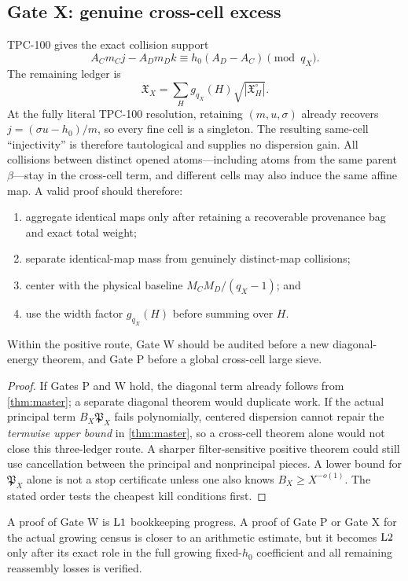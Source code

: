 \subsection{Gate X: genuine cross-cell excess}

TPC-100 gives the exact collision support
\[
 A_Cm_Cj-A_Dm_Dk
 \equiv h_0(A_D-A_C)\pmod{q_X}.
\]
The remaining ledger is
\[
 \mathfrak X_X
 =
 \sum_Hg_{q_X}(H)
 \sqrt{|\mathfrak X_H^\circ|}.
\]
At the fully literal TPC-100 resolution, retaining
\((m,u,\sigma)\) already recovers
\(j=(\sigma u-h_0)/m\), so every fine cell is a singleton.
The resulting same-cell ``injectivity'' is therefore tautological
and supplies no dispersion gain.  All collisions between distinct
opened atoms---including atoms from the same parent \(\beta\)---stay
in the cross-cell term, and different cells may also induce the same
affine map.  A valid proof should therefore:
\begin{enumerate}[leftmargin=2em]
\item aggregate identical maps only after retaining a recoverable
  provenance bag and exact total weight;
\item separate identical-map mass from genuinely distinct-map
  collisions;
\item center with the physical baseline \(M_CM_D/(q_X-1)\); and
\item use the width factor \(g_{q_X}(H)\) before summing over \(H\).
\end{enumerate}

\begin{proposition}
\label{prop:attack-order}
Within the positive route, Gate W should be audited before a new
diagonal-energy theorem, and Gate P before a global cross-cell
large sieve.
\end{proposition}

\begin{proof}
If Gates P and W hold, the diagonal term already follows from
\cref{thm:master}; a separate diagonal theorem would duplicate work.
If the actual principal term \(B_X\mathfrak P_X\) fails
polynomially, centered dispersion cannot repair the
\emph{termwise upper bound} in \cref{thm:master}, so a cross-cell
theorem alone would not close this three-ledger route.  A sharper
filter-sensitive positive theorem could still use cancellation
between the principal and nonprincipal pieces.  A lower bound for
\(\mathfrak P_X\) alone is not a stop certificate unless one also
knows \(B_X\ge X^{-o(1)}\).  The stated order tests the cheapest kill
conditions first.
\end{proof}

\begin{remark}
A proof of Gate W is \(\mathrm{L1}\) bookkeeping progress.  A proof of
Gate P or Gate X for the actual growing census is closer to an
arithmetic estimate, but it becomes \(\mathrm{L2}\) only after its exact
role in the full growing fixed-\(h_0\) coefficient and all remaining
reassembly losses is verified.
\end{remark}
